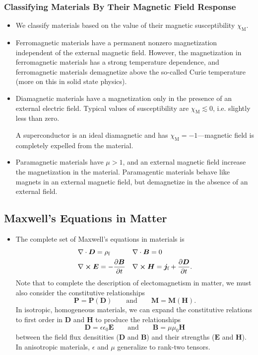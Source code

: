 \documentclass[11pt, a4paper]{article}
\renewcommand{\vec}[1]{\bm{#1}} %
\newcommand{\E}{\vec{E}} %
\newcommand{\D}{\vec{D}}  %
\newcommand{\B}{\vec{B}} %
\renewcommand{\H}{\vec{H}}  %
\renewcommand{\P}{\vec{P}}  %
\newcommand{\M}{\vec{M}}  %
\newcommand{\e}{\epsilon}
\newcommand{\ee}{\epsilon_{0}}  %
\newcommand{\mm}{\mu_{0}}  %
\renewcommand{\j}{\vec{j}}  %
\renewcommand{\div}{\nabla \cdot}
\renewcommand{\curl}{\nabla \cross}
\begin{document}
\subsubsection{Classifying Materials By Their Magnetic Field Response}
\begin{itemize}
	\item We classify materials based on the value of their magnetic susceptibility $ \chi_{\text{M}} $. 
	
	\item Ferromagnetic materials have a permanent nonzero magnetization independent of the external magnetic field. However, the magnetization in ferromagnetic materials has a strong temperature dependence, and ferromagnetic materials demagnetize above the so-called Curie temperature (more on this in solid state physics).
	
    \item Diamagnetic materials have a magnetization only in the presence of an external electric field. Typical values of susceptibility are $ \chi_{\text{M}} \lesssim 0 $, i.e. slightly less than zero.
	
	A superconductor is an ideal diamagnetic and has $ \chi_{\text{M}} = -1 $---magnetic field is completely expelled from the material.
	
	\item Paramagnetic materials have $ \mu > 1 $, and an external magnetic field increase the magnetization in the material. Paramagentic materials behave like magnets in an external magnetic field, but demagnetize in the absence of an external field. 
\end{itemize}

\subsection{Maxwell's Equations in Matter}
\begin{itemize}
	\item The complete set of Maxwell's equations in materials is
	\begin{align*}
		& \div \D = \rho_{\text{f}} && \div \B = 0\\
		& \curl \E = - \pdv{\B}{t} &&  \curl \H = \j_{\text{f}} + \pdv{\D}{t}.
	\end{align*}
	Note that to complete the description of electomagnetism in matter, we must also consider the constitutive relationships
    \begin{equation*}
        \P = \P(\D) \qquad \text{and} \qquad \M = \M(\H).
    \end{equation*}
    In isotropic, homogeneous materials, we can expand the constitutive relations to first order in $ \D $ and $ \H $ to produce the relationships
    \begin{equation*}
        \D = \e \ee \E \qquad \text{and} \qquad \B = \mu \mm \H
    \end{equation*}
    between the field flux densitities ($ \D $ and $ \B $) and their strengths ($ \E $ and $ \H $).
	In anisotropic materials, $ \e $ and $ \mu $  generalize to rank-two tensors.
	
\end{itemize}
\end{document}
